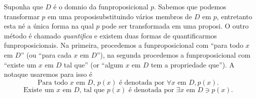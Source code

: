 Suponha que $D$ \'e o dom\ih nio da fun\cao proposicional $p$. Sabemos que podemos transformar $p$ em uma proposi\cao substituindo v\'arios membros de $D$ em $p$, entretanto esta n\ao \'e a \'unica forma na qual $p$ pode ser transformada em uma proposi\caoi. O outro m\'etodo \'e chamado {\it quantifica\cao} e existem duas formas  de quantificarmos fun\coes proposicionais. Na primeira, procedemos a fun\cao proposicional com ``para todo $x$ em $D$'' (ou ``para cada $x$ em $D$''), na segunda procedemos a fun\cao proposicional com ``existe um $x$ em $D$ tal que'' (or ``algum $x$ em $D$ tem a propriedade que''). A nota\cao que usaremos para isso \'e
\[
\textrm{Para todo $x$ em $D$, $p(x)$ \'e denotada por $\forall x$ em $D, p(x).$}
\] 
\[
\textrm{Existe um $x$ em $D$, tal que $p(x)$ \'e denotada por $\exists x$ em $D \ni p(x).$}
\] 

